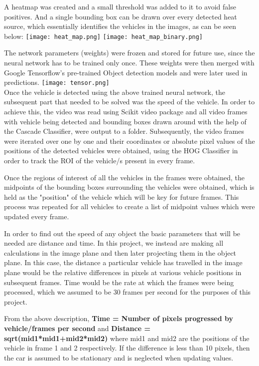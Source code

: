 \documentclass[conference]{IEEEtran}
\begin{document}
A heatmap was created and a small threshold was added to it to avoid false positives. And a single bounding box can be drawn over every detected heat source, which essentially identifies the vehicles in the images, as can be seen below:
\texttt{[image: heat\_map.png]}
\texttt{[image: heat\_map\_binary.png]}

The network parameters (weights) were frozen and stored for future use, since the neural network has to be trained only once. These weights were then merged with Google Tensorflow's pre-trained Object detection models\cite{b17} and were later used in predictions. 
\texttt{[image: tensor.png]} \\
Once the vehicle is detected using the above trained neural network, the subsequent part that needed to be solved was the speed of the vehicle. In order to achieve this, the video was read using Scikit video package and all video frames with vehicle being detected and bounding boxes drawn around with the help of the Cascade Classifier, were output to a folder. Subsequently, the video frames were iterated over one by one and their coordinates or absolute pixel values of the positions of the detected vehicles were obtained, using the HOG Classifier in order to track the ROI of the vehicle/s present in every frame. 

Once the regions of interest of all the vehicles in the frames were obtained, the midpoints of the bounding boxes surrounding the vehicles were obtained, which is held as the "position" of the vehicle which will be key for future frames. This process was repeated for all vehicles to create a list of midpoint values which were updated every frame.  

In order to find out the speed of any object the basic parameters that will be needed are distance and time. In this project, we instead are making all calculations in the image plane and then later projecting them in the object plane. In this case, the distance a particular vehicle has travelled in the image plane would be the relative differences in pixels at various vehicle positions in subsequent frames. Time would be the rate at which the frames were being processed, which we assumed to be 30 frames per second for the purposes of this project. 

From the above description, \textbf{Time = Number of pixels progressed by vehicle/frames per second}  and \textbf{Distance = sqrt(mid1*mid1+mid2*mid2)} where mid1 and mid2 are the positions of the vehicle in frame 1 and 2 respectively. If the difference is less than 10 pixels, then the car is assumed to be stationary and is neglected when updating values. 
\end{document}
